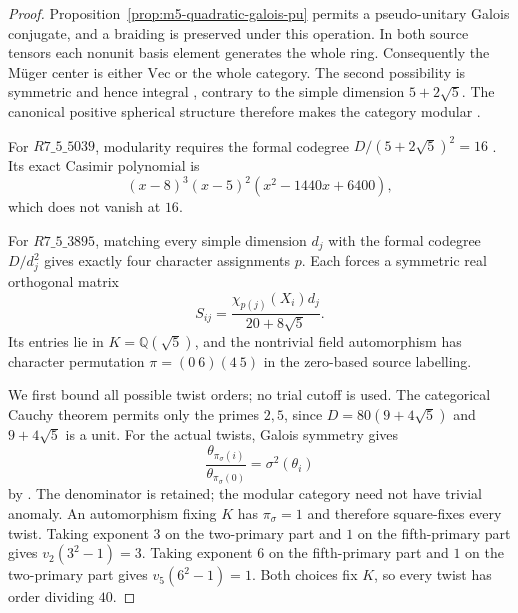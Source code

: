 \begin{proof}
Proposition~\ref{prop:m5-quadratic-galois-pu} permits a pseudo-unitary
Galois conjugate, and a braiding is preserved under this operation.
In both source tensors each nonunit basis element generates the whole
ring.  Consequently the M\"uger center is either $\mathrm{Vec}$ or the
whole category.  The second possibility is symmetric and hence integral
\cite[Corollary~9.9.11]{EGNO}, contrary to the simple dimension
$5+2\sqrt5$.  The canonical positive spherical structure therefore
makes the category modular
\cite[Propositions~9.5.1 and~8.20.12]{EGNO}.

For $R7\_5\_5039$, modularity requires the formal codegree
$D/(5+2\sqrt5)^2=16$ \cite[Section~3]{OstrikCodegrees}.
Its exact Casimir polynomial is
\[
 (x-8)^3(x-5)^2(x^2-1440x+6400),
\]
which does not vanish at $16$.

For $R7\_5\_3895$, matching every simple dimension $d_j$ with the
formal codegree $D/d_j^2$ gives exactly four character assignments $p$.
Each forces a symmetric real orthogonal matrix
\[
 S_{ij}=\frac{\chi_{p(j)}(X_i)d_j}{20+8\sqrt5}.
\]
Its entries lie in $K=\mathbb Q(\sqrt5)$, and the nontrivial field
automorphism has character permutation $\pi=(0\ 6)(4\ 5)$ in
the zero-based source labelling.

We first bound all possible twist orders; no trial cutoff is used.
The categorical Cauchy theorem \cite[Theorem~3.9]{BNRW} permits only
the primes $2,5$, since $D=80(9+4\sqrt5)$ and $9+4\sqrt5$ is a unit.
For the actual twists, Galois symmetry gives
\begin{equation}\label{eq:m5-braided-galois-twist}
 \frac{\theta_{\pi_\sigma(i)}}{\theta_{\pi_\sigma(0)}}
       =\sigma^2(\theta_i)
\end{equation}
by \cite[Proposition~4.7, equation~(4.12)]{DongLinNg}.
The denominator is retained; the modular category need not have
trivial anomaly.  An automorphism fixing $K$ has $\pi_\sigma=1$
and therefore square-fixes every twist.  Taking exponent $3$ on the
two-primary part and $1$ on the fifth-primary part gives
$v_2(3^2-1)=3$.  Taking exponent $6$ on the fifth-primary part and
$1$ on the two-primary part gives $v_5(6^2-1)=1$.  Both choices fix
$K$, so every twist has order dividing $40$.


\end{proof}
